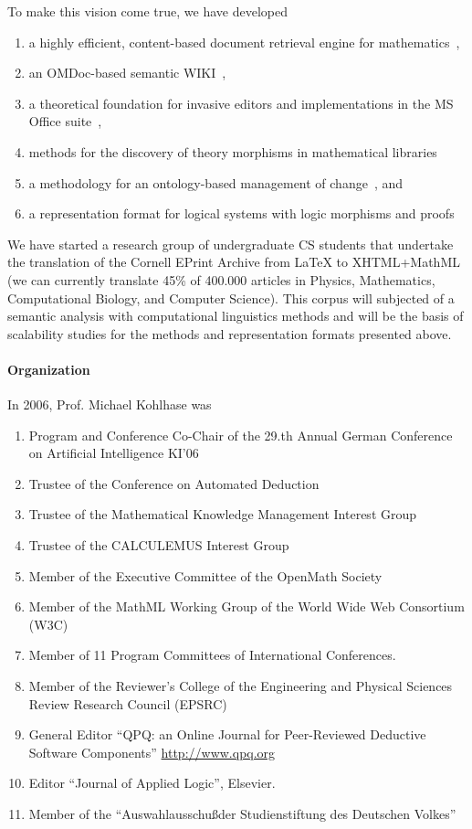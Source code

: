 To make this vision come true, we have developed
\begin{enumerate}
\item a highly efficient, content-based document retrieval engine for
  mathematics~\cite{KohSuc:asemf06},
\item an OMDoc-based semantic WIKI~\cite{LanKoh:swim06,LanKoh:swmkm06,lange06:wikiblog},
\item a theoretical foundation for invasive editors and implementations in the MS Office
  suite~\cite{Kohlhase:UserAsPrisoner,Kohlhase:MediaOrMedeaSociety,Kohlhase:emPowerPoint},
\item methods for the discovery of theory morphisms in mathematical
  libraries~\cite{Normann:etrpti06}
\item a methodology for an ontology-based management of
  change~\cite{NRM:omdoc2vf06,Mueller06:locutor-lwa}, and
\item a representation format for logical systems with logic morphisms and
  proofs~\cite{rabe:dfol:06,rabe:moloss:06}
\end{enumerate}
We have started a research group of undergraduate CS students that undertake the
translation of the Cornell EPrint Archive from {\LaTeX} to XHTML+MathML (we can currently
translate 45\% of 400.000 articles in Physics, Mathematics, Computational Biology, and
Computer Science). This corpus will subjected of a semantic analysis with computational
linguistics methods and will be the basis of scalability studies for the methods and
representation formats presented above.

\paragraph{Organization}

In 2006, Prof. Michael Kohlhase was
\begin{enumerate}
\item Program and Conference Co-Chair of the 29.th Annual German Conference on Artificial
  Intelligence KI'06\cite{KI06}
\item Trustee of the Conference on Automated Deduction
\item Trustee of the Mathematical Knowledge Management Interest Group
\item Trustee of the CALCULEMUS Interest Group
\item Member of the Executive Committee of the OpenMath Society
\item Member of the MathML Working Group of the World Wide Web Consortium (W3C)
\item Member of 11 Program Committees of International Conferences.
\item Member of the Reviewer's College of the Engineering and Physical Sciences Review
  Research Council (EPSRC)
\item General Editor ``QPQ: an Online Journal for Peer-Reviewed Deductive Software
  Components'' {\url{http://www.qpq.org}}
\item Editor ``Journal of Applied Logic'', Elsevier.
\item Member of the ``Auswahlausschu\ss der Studienstiftung des Deutschen Volkes''
\end{enumerate}

